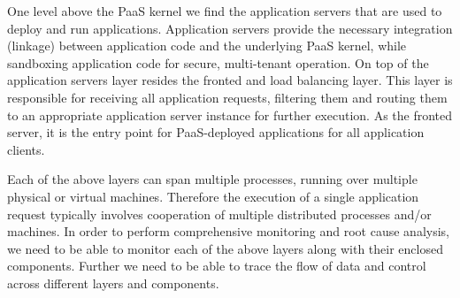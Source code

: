 One level above the PaaS kernel we find the application servers that are used to deploy and run
applications. Application servers provide the necessary integration (linkage) between application code and the
underlying PaaS kernel, while sandboxing application code for secure, multi-tenant operation. On top
of the application servers layer resides the fronted and load balancing layer. This layer is responsible
for receiving all application requests, filtering them and routing them to an appropriate application
server instance for further execution. As the fronted server, it is the entry point for PaaS-deployed
applications for all application clients.

Each of the above layers can span multiple processes, running over multiple physical or virtual
machines. Therefore the execution of a single application request typically involves cooperation
of multiple distributed processes and/or machines. In order to perform comprehensive monitoring
and root cause analysis, we need to be able to monitor each of the above layers along with their
enclosed components. Further we need to be able to trace the flow of data and control
across different layers and components.
